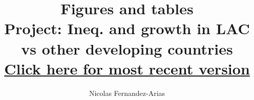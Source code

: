 \documentclass[12pt,english]{article}
\theoremstyle{remark}
\begin{document}
	
	\title{Figures and tables\\ \small Project: Ineq. and growth in LAC vs other developing countries \\ \href{https://drive.google.com/open?id=1scBTr_BbYT9DM73woQAA136QVIfP6-Jr}{Click here for most recent version}}
	\author{Nicolas Fernandez-Arias}
	\maketitle
	


\footnotesize 


\footnotesize

\normalsize

\footnotesize

\normalsize

\footnotesize

\normalsize

\scriptsize

\scriptsize

\scriptsize

\scriptsize





















\end{document}
